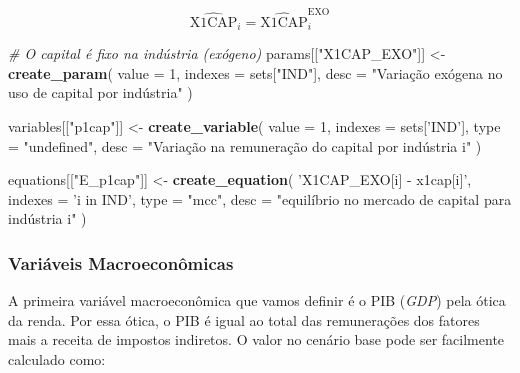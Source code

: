 \documentclass[12pt,twoside]{article}
\newenvironment{Shaded}{\begin{snugshade}}{\end{snugshade}}
\newcommand{\CommentTok}[1]{\textcolor[rgb]{0.56,0.35,0.01}{\textit{#1}}}
\newcommand{\DataTypeTok}[1]{\textcolor[rgb]{0.13,0.29,0.53}{#1}}
\newcommand{\DecValTok}[1]{\textcolor[rgb]{0.00,0.00,0.81}{#1}}
\newcommand{\KeywordTok}[1]{\textcolor[rgb]{0.13,0.29,0.53}{\textbf{#1}}}
\newcommand{\NormalTok}[1]{#1}
\newcommand{\StringTok}[1]{\textcolor[rgb]{0.31,0.60,0.02}{#1}}
\let\oldShaded\Shaded
\let\endoldShaded\endShaded
\renewenvironment{Shaded}{\footnotesize\oldShaded}{\endoldShaded}
\begin{document}
\[\hat{\text{X1CAP}}_i = \hat{\text{X1CAP}}_i^{\text{EXO}}\]

\begin{Shaded}
\begin{Highlighting}[]
\CommentTok{# O capital é fixo na indústria (exógeno)}
\NormalTok{params[[}\StringTok{"X1CAP_EXO"}\NormalTok{]] <-}\StringTok{ }\KeywordTok{create_param}\NormalTok{(}
  \DataTypeTok{value =} \DecValTok{1}\NormalTok{,}
  \DataTypeTok{indexes =}\NormalTok{ sets[}\StringTok{"IND"}\NormalTok{],}
  \DataTypeTok{desc =} \StringTok{"Variação exógena no uso de capital por indústria"}
\StringTok{)}
\end{Highlighting}
\end{Shaded}

\begin{Shaded}
\begin{Highlighting}[]
\NormalTok{variables[[}\StringTok{"p1cap"}\NormalTok{]] <-}\StringTok{ }\KeywordTok{create_variable}\NormalTok{(}
  \DataTypeTok{value =} \DecValTok{1}\NormalTok{,}
  \DataTypeTok{indexes =}\NormalTok{ sets[}\StringTok{'IND'}\NormalTok{],}
  \DataTypeTok{type =} \StringTok{"undefined"}\NormalTok{,}
  \DataTypeTok{desc =} \StringTok{"Variação na remuneração do capital por indústria i"}
\NormalTok{)}
\end{Highlighting}
\end{Shaded}

\begin{Shaded}
\begin{Highlighting}[]
\NormalTok{equations[[}\StringTok{"E_p1cap"}\NormalTok{]] <-}\StringTok{ }\KeywordTok{create_equation}\NormalTok{(}
  \StringTok{'X1CAP_EXO[i] - x1cap[i]'}\NormalTok{,}
  \DataTypeTok{indexes =} \StringTok{'i in IND'}\NormalTok{,}
  \DataTypeTok{type =} \StringTok{"mcc"}\NormalTok{,}
  \DataTypeTok{desc =} \StringTok{"equilíbrio no mercado de capital para indústria i"}
\NormalTok{)}
\end{Highlighting}
\end{Shaded}

\hypertarget{variuxe1veis-macroeconuxf4micas}{%
\subsubsection{Variáveis
Macroeconômicas}\label{variuxe1veis-macroeconuxf4micas}}

A primeira variável macroeconômica que vamos definir é o PIB
(\emph{GDP}) pela ótica da renda. Por essa ótica, o PIB é igual ao total
das remunerações dos fatores mais a receita de impostos indiretos. O
valor no cenário base pode ser facilmente calculado como:
\end{document}
